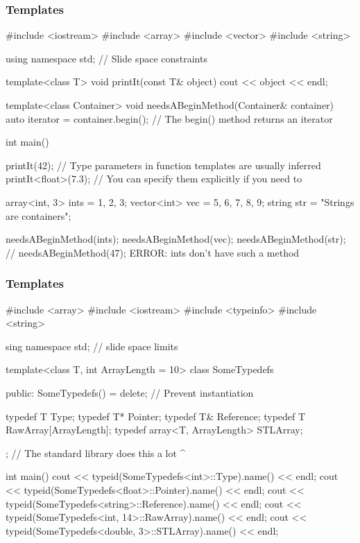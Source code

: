 \documentclass[glossy]{beamer}
\begin{document}
\begin{frame}[fragile=singleslide]
  \frametitle{Templates}
  \begin{cppcode}
#include <iostream>
#include <array> 
#include <vector> 
#include <string> 

using namespace std; // Slide space constraints 

template<class T> 
void printIt(const T& object) { 
  cout << object << endl; 
} 

template<class Container> 
void needsABeginMethod(Container& container) { 
  auto iterator = container.begin(); // The begin() method returns an iterator 
} 

int main() { 
  printIt(42); // Type parameters in function templates are usually inferred 
  printIt<float>(7.3); // You can specify them explicitly if you need to 

  array<int, 3> ints = {1, 2, 3}; 
  vector<int> vec = {5, 6, 7, 8, 9}; 
  string str = "Strings are containers"; 

  needsABeginMethod(ints); 
  needsABeginMethod(vec); 
  needsABeginMethod(str); 
  // needsABeginMethod(47); ERROR: ints don't have such a method 
}
  \end{cppcode}
\end{frame}

\begin{frame}[fragile=singleslide]
  \frametitle{Templates}
  \begin{cppcode}
#include <array> 
#include <iostream> 
#include <typeinfo> 
#include <string> 

sing namespace std; // slide space limits 

template<class T, int ArrayLength = 10> 
class SomeTypedefs { 
  public: 
    SomeTypedefs() = delete; // Prevent instantiation 

    typedef T Type; 
    typedef T* Pointer; 
    typedef T& Reference; 
    typedef T RawArray[ArrayLength]; 
    typedef array<T, ArrayLength> STLArray; 
};
// The standard library does this a lot ^

int main() {
  cout << typeid(SomeTypedefs<int>::Type).name() << endl;
  cout << typeid(SomeTypedefs<float>::Pointer).name() << endl; 
  cout << typeid(SomeTypedefs<string>::Reference).name() << endl; 
  cout << typeid(SomeTypedefs<int, 14>::RawArray).name() << endl;
  cout << typeid(SomeTypedefs<double, 3>::STLArray).name() << endl; 
}
  \end{cppcode}
\end{frame}
\end{document}
